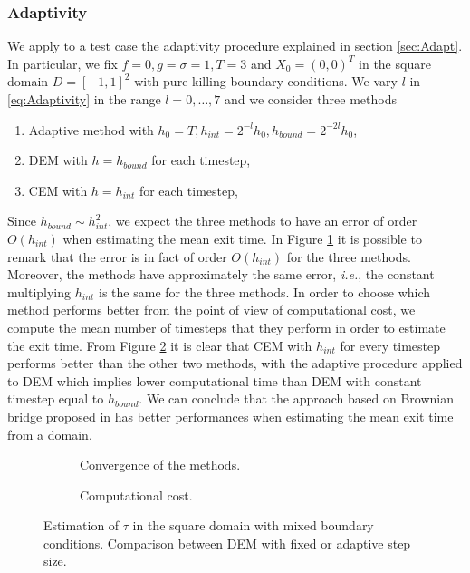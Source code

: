 \subsubsection{Adaptivity}
We apply to a test case the adaptivity procedure explained in section \ref{sec:Adapt}. In particular, we fix $f = 0, g = \sigma = 1, T = 3$ and $X_0 = (0,0)^T$ in the square domain $D = \left[-1,1\right]^2$ with pure killing boundary conditions. We vary $l$ in \eqref{eq:Adaptivity} in the range $l = 0, \dots, 7$ and we consider three methods
\begin{enumerate}
	\item Adaptive method with $h_0 = T, h_{int} = 2^{-l}h_0, h_{bound} = 2^{-2l}h_0$,
	\item DEM with $h = h_{bound}$ for each timestep,
	\item CEM with $h = h_{int}$ for each timestep,
\end{enumerate}
Since $h_{bound} \sim h_ {int}^2$, we expect the three methods to have an error of order $O(h_{int})$ when estimating the mean exit time. In Figure \ref{fig:AdaptErr} it is possible to remark that the error is in fact of order $O(h_{int})$ for the three methods. Moreover, the methods have approximately the same error, \textit{i.e.}, the constant multiplying $h_{int}$ is the same for the three methods. In order to choose which method performs better from the point of view of computational cost, we compute the mean number of timesteps that they perform in order to estimate the exit time. From Figure \ref{fig:AdaptCost} it is clear that CEM with $h_{int}$ for every timestep performs better than the other two methods, with the adaptive procedure applied to DEM which implies lower computational time than DEM with constant timestep equal to $h_{bound}$. We can conclude that the approach based on Brownian bridge proposed in \cite{Gobet2001} has better performances when estimating the mean exit time from a domain.

\begin{figure}[t]
    \centering
    \begin{subfigure}{0.49\linewidth}
        \centering
        \resizebox{1\linewidth}{!}{ }  
        \caption{Convergence of the methods.}
        \label{fig:AdaptErr}
    \end{subfigure}
    \begin{subfigure}{0.49\linewidth}
        \centering
        \resizebox{1\linewidth}{!}{ }  
        \caption{Computational cost.}
        \label{fig:AdaptCost}
    \end{subfigure}    
    \caption{Estimation of $\tau$ in the square domain with mixed boundary conditions. Comparison between DEM with fixed or adaptive step size.}
    \label{fig:AdaptResults}
\end{figure}

